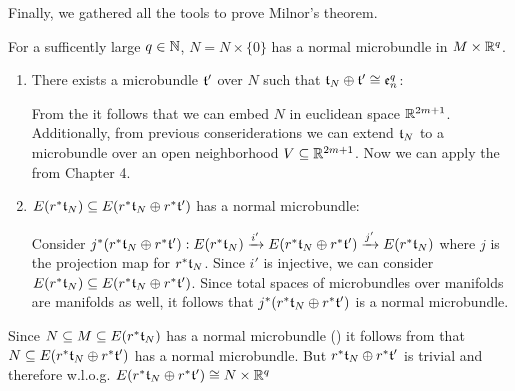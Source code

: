 Finally, we gathered all the tools to prove Milnor's theorem.

\newcommand{\whitney} {
    r^*\bt_N \oplus{} r^*\bt'
}
\newcommand{\rtn} {
    r^*\bt_N
}

For a sufficently large $q \in \N$, $N = N \times \{0\}$ has a normal microbundle in $M \times \R^q$.
\begin{myproof}
    \begin{enumerate}
        \item There exists a microbundle $\bt'$ over $N$ such that $\bt_N \oplus \bt' \cong \be[q]_n$:
        
        From the  it follows that we can embed $N$ in euclidean space $\R^{2m + 1}$.
        Additionally, from previous conseriderations we can extend $\bt_N$ to a microbundle over an open neighborhood $V \sub \R^{2m + 1}$.
        Now we can apply the  from Chapter 4.

        \item $E(\rtn) \sub E(\whitney)$ has a normal microbundle:

        Consider $\bundledef{j^*(\whitney)}{E(\rtn)}{E(\whitney)}{i'}{j'}$ where $j$ is the projection map for $\rtn$.
        Since $i'$ is injective, we can consider $E(\rtn) \sub E(\whitney)$.
        Since total spaces of microbundles over manifolds are manifolds as well, it follows that $j^*(\whitney)$ is a normal microbundle.
    \end{enumerate}
    Since $N \sub M \sub E(\rtn)$ has a normal microbundle () it follows from  that $N \sub E(r^*\bt_N \oplus r^*\bt')$ has a normal microbundle.
    But $r^*\bt_N \oplus r^*\bt'$ is trivial and therefore w.l.o.g. $E(\whitney) \cong N \times \R^q$
\end{myproof}